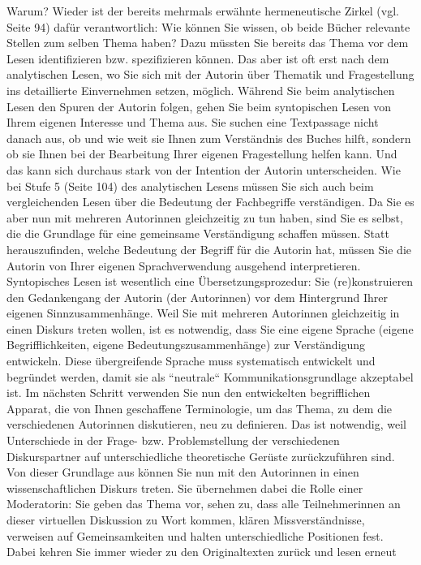 \documentclass[]{book}
\theoremstyle{definition}
\theoremstyle{definition}
\theoremstyle{definition}
\theoremstyle{remark}
\begin{document}
Warum? Wieder ist der bereits mehrmals erwähnte hermeneutische Zirkel
(vgl. Seite 94) dafür verantwortlich: Wie können Sie wissen, ob beide
Bücher relevante Stellen zum selben Thema haben? Dazu müssten Sie
bereits das Thema vor dem Lesen identifizieren bzw. spezifizieren
können. Das aber ist oft erst nach dem analytischen Lesen, wo Sie sich
mit der Autorin über Thematik und Fragestellung ins detaillierte
Einvernehmen setzen, möglich. Während Sie beim analytischen Lesen den
Spuren der Autorin folgen, gehen Sie beim syntopischen Lesen von Ihrem
eigenen Interesse und Thema aus. Sie suchen eine Textpassage nicht
danach aus, ob und wie weit sie Ihnen zum Verständnis des Buches hilft,
sondern ob sie Ihnen bei der Bearbeitung Ihrer eigenen Fragestellung
helfen kann. Und das kann sich durchaus stark von der Intention der
Autorin unterscheiden. Wie bei Stufe 5 (Seite 104) des analytischen
Lesens müssen Sie sich auch beim vergleichenden Lesen über die Bedeutung
der Fachbegriffe verständigen. Da Sie es aber nun mit mehreren
Autorinnen gleichzeitig zu tun haben, sind Sie es selbst, die die
Grundlage für eine gemeinsame Verständigung schaffen müssen. Statt
herauszufinden, welche Bedeutung der Begriff für die Autorin hat, müssen
Sie die Autorin von Ihrer eigenen Sprachverwendung ausgehend
interpretieren. Syntopisches Lesen ist wesentlich eine
Übersetzungsprozedur: Sie (re)konstruieren den Gedankengang der Autorin
(der Autorinnen) vor dem Hintergrund Ihrer eigenen Sinnzusammenhänge.
Weil Sie mit mehreren Autorinnen gleichzeitig in einen Diskurs treten
wollen, ist es notwendig, dass Sie eine eigene Sprache (eigene
Begrifflichkeiten, eigene Bedeutungszusammenhänge) zur Verständigung
entwickeln. Diese übergreifende Sprache muss systematisch entwickelt und
begründet werden, damit sie als ``neutrale`` Kommunikationsgrundlage
akzeptabel ist. Im nächsten Schritt verwenden Sie nun den entwickelten
begrifflichen Apparat, die von Ihnen geschaffene Terminologie, um das
Thema, zu dem die verschiedenen Autorinnen diskutieren, neu zu
definieren. Das ist notwendig, weil Unterschiede in der Frage- bzw.
Problemstellung der verschiedenen Diskurspartner auf unterschiedliche
theoretische Gerüste zurückzuführen sind. Von dieser Grundlage aus
können Sie nun mit den Autorinnen in einen wissenschaftlichen Diskurs
treten. Sie übernehmen dabei die Rolle einer Moderatorin: Sie geben das
Thema vor, sehen zu, dass alle Teilnehmerinnen an dieser virtuellen
Diskussion zu Wort kommen, klären Missverständnisse, verweisen auf
Gemeinsamkeiten und halten unterschiedliche Positionen fest. Dabei
kehren Sie immer wieder zu den Originaltexten zurück und lesen erneut
\end{document}
